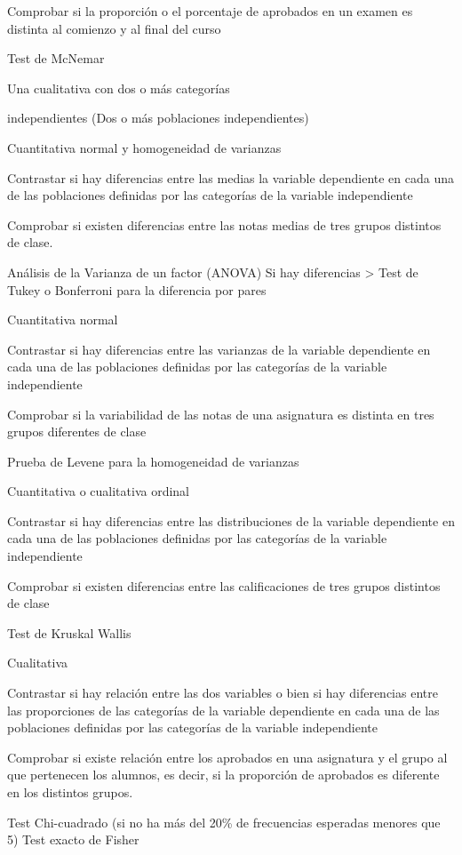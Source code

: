 \documentclass[
  a4paper,
]{scrreport}
\theoremstyle{definition}
\theoremstyle{definition}
\theoremstyle{remark}
\begin{document}
Comprobar si la proporción o el porcentaje de aprobados en un examen es
distinta al comienzo y al final del curso

Test de McNemar

Una cualitativa con dos o más categorías

independientes (Dos o más poblaciones independientes)

Cuantitativa normal y homogeneidad de varianzas

Contrastar si hay diferencias entre las medias la variable dependiente
en cada una de las poblaciones definidas por las categorías de la
variable independiente

Comprobar si existen diferencias entre las notas medias de tres grupos
distintos de clase.

Análisis de la Varianza de un factor (ANOVA) Si hay diferencias
\textgreater{} Test de Tukey o Bonferroni para la diferencia por pares

Cuantitativa normal

Contrastar si hay diferencias entre las varianzas de la variable
dependiente en cada una de las poblaciones definidas por las categorías
de la variable independiente

Comprobar si la variabilidad de las notas de una asignatura es distinta
en tres grupos diferentes de clase

Prueba de Levene para la homogeneidad de varianzas

Cuantitativa o cualitativa ordinal

Contrastar si hay diferencias entre las distribuciones de la variable
dependiente en cada una de las poblaciones definidas por las categorías
de la variable independiente

Comprobar si existen diferencias entre las calificaciones de tres grupos
distintos de clase

Test de Kruskal Wallis

Cualitativa

Contrastar si hay relación entre las dos variables o bien si hay
diferencias entre las proporciones de las categorías de la variable
dependiente en cada una de las poblaciones definidas por las categorías
de la variable independiente

Comprobar si existe relación entre los aprobados en una asignatura y el
grupo al que pertenecen los alumnos, es decir, si la proporción de
aprobados es diferente en los distintos grupos.

Test Chi-cuadrado (si no ha más del 20\% de frecuencias esperadas
menores que 5) Test exacto de Fisher
\end{document}
